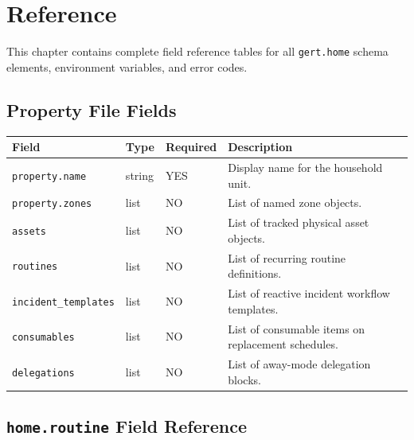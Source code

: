 \chapter{Reference}
\label{ch:reference}

This chapter contains complete field reference tables for all \texttt{gert.home} schema
elements, environment variables, and error codes.

\section{Property File Fields}
\label{sec:ref-property-fields}

\begin{center}
\small
\begin{tabular}{lllp{5.5cm}}
\textbf{Field} & \textbf{Type} & \textbf{Required} & \textbf{Description} \\
\hline
\texttt{property.name} & string & YES & Display name for the household unit. \\
\texttt{property.zones} & list & NO & List of named zone objects. \\
\texttt{assets} & list & NO & List of tracked physical asset objects. \\
\texttt{routines} & list & NO & List of recurring routine definitions. \\
\texttt{incident\_templates} & list & NO & List of reactive incident workflow templates. \\
\texttt{consumables} & list & NO & List of consumable items on replacement schedules. \\
\texttt{delegations} & list & NO & List of away-mode delegation blocks. \\
\end{tabular}
\end{center}

\section{\texttt{home.routine} Field Reference}
\label{sec:ref-routine-fields}

